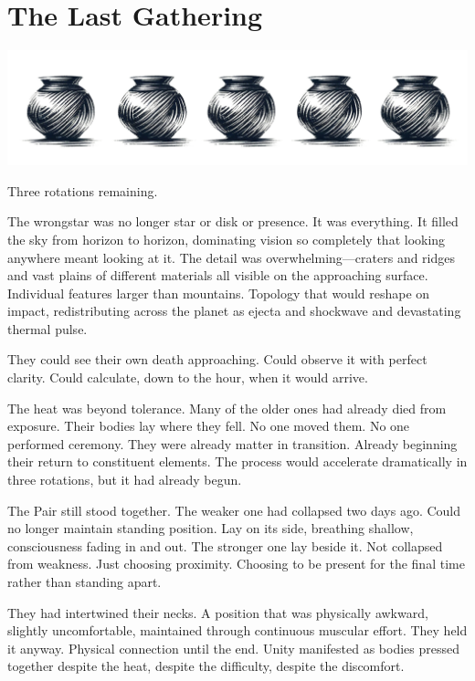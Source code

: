 \chapter{The Last Gathering}
\label{ch:14}



\begin{center}
\includegraphics[width=\textwidth]{images/chapterImages/genesis_sketch_00092_.png}
\end{center}

Three rotations remaining.

The wrongstar was no longer star or disk or presence. It was everything. It filled the sky from horizon to horizon, dominating vision so completely that looking anywhere meant looking at it. The detail was overwhelming—craters and ridges and vast plains of different materials all visible on the approaching surface. Individual features larger than mountains. Topology that would reshape on impact, redistributing across the planet as ejecta and shockwave and devastating thermal pulse.

They could see their own death approaching. Could observe it with perfect clarity. Could calculate, down to the hour, when it would arrive.

The heat was beyond tolerance. Many of the older ones had already died from exposure. Their bodies lay where they fell. No one moved them. No one performed ceremony. They were already matter in transition. Already beginning their return to constituent elements. The process would accelerate dramatically in three rotations, but it had already begun.

The Pair still stood together. The weaker one had collapsed two days ago. Could no longer maintain standing position. Lay on its side, breathing shallow, consciousness fading in and out. The stronger one lay beside it. Not collapsed from weakness. Just choosing proximity. Choosing to be present for the final time rather than standing apart.

They had intertwined their necks. A position that was physically awkward, slightly uncomfortable, maintained through continuous muscular effort. They held it anyway. Physical connection until the end. Unity manifested as bodies pressed together despite the heat, despite the difficulty, despite the discomfort.

